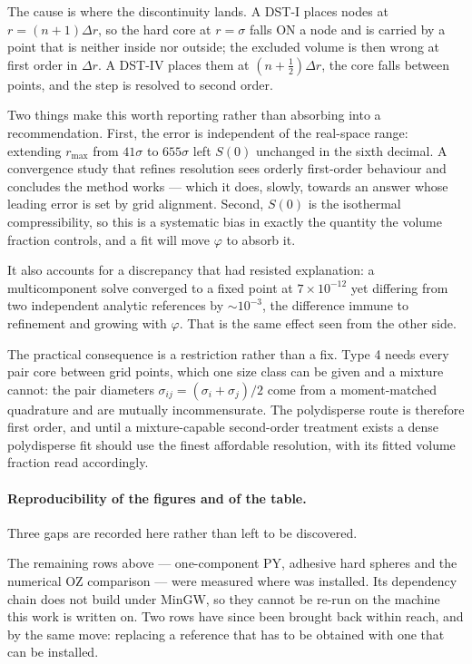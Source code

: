 The cause is where the discontinuity lands. A DST-I places nodes at
$r = (n+1)\Delta r$, so the hard core at $r = \sigma$ falls ON a node and is
carried by a point that is neither inside nor outside; the excluded volume is
then wrong at first order in $\Delta r$. A DST-IV places them at
$(n+\frac{1}{2})\Delta r$, the core falls between points, and the step is
resolved to second order.

Two things make this worth reporting rather than absorbing into a
recommendation. First, the error is independent of the real-space range:
extending $r_{\max}$ from $41\sigma$ to $655\sigma$ left $S(0)$ unchanged in
the sixth decimal. A convergence study that refines resolution sees orderly
first-order behaviour and concludes the method works --- which it does, slowly,
towards an answer whose leading error is set by grid alignment. Second,
$S(0)$ is the isothermal compressibility, so this is a systematic bias in
exactly the quantity the volume fraction controls, and a fit will move
$\varphi$ to absorb it.

It also accounts for a discrepancy that had resisted explanation: a
multicomponent solve converged to a fixed point at $7\times10^{-12}$ yet
differing from two independent analytic references by $\sim10^{-3}$, the
difference immune to refinement and growing with $\varphi$. That is the same
effect seen from the other side.

The practical consequence is a restriction rather than a fix. Type 4 needs
every pair core between grid points, which one size class can be given and a
mixture cannot: the pair diameters $\sigma_{ij} = (\sigma_i+\sigma_j)/2$ come
from a moment-matched quadrature and are mutually incommensurate. The
polydisperse route is therefore first order, and until a mixture-capable
second-order treatment exists a dense polydisperse fit should use the finest
affordable resolution, with its fitted volume fraction read accordingly.

\paragraph{Reproducibility of the figures and of the table.} Three gaps are
recorded here rather than left to be discovered.

The remaining  rows above --- one-component PY, adhesive
hard spheres and the numerical OZ comparison --- were measured where
 was installed. Its dependency chain does not build under
MinGW, so they cannot be re-run on the machine this work is written on. Two
rows have since been brought back within reach, and by the same move:
replacing a reference that has to be obtained with one that can be
installed.

